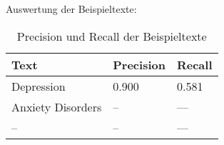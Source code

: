 Auswertung der Beispieltexte:

\begin{table}
\begin{center}
\begin{tabular}{lll}
\toprule
      Text & Precision & Recall \\
\midrule
Depression &     0.900 &  0.581 \\
Anxiety Disorders &     -- &  --- \\
-- &     -- &  --- \\
\bottomrule
\end{tabular}
\caption{Precision und Recall der Beispieltexte}
\label{tab:vergleich_manuell_medextractor}
\end{center}
\end{table}




